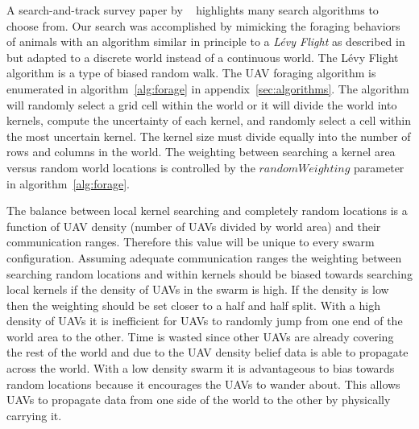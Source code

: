A search-and-track survey paper by ~\textcite{senanayake} highlights many search algorithms to choose from. Our search was accomplished by mimicking the foraging behaviors of animals with an algorithm similar in principle to a \textit{L\'evy Flight} as described in \textcite{humphries} but adapted to a discrete world instead of a continuous world.  The L\'evy Flight algorithm is a type of biased random walk.  The UAV foraging algorithm is enumerated in algorithm~\ref{alg:forage} in appendix~\ref{sec:algorithms}.  The algorithm will randomly select a grid cell within the world or it will divide the world into kernels, compute the uncertainty of each kernel, and randomly select a cell within the most uncertain kernel.  The kernel size must divide equally into the number of rows and columns in the world.  The weighting between searching a kernel area versus random world locations is controlled by the $randomWeighting$ parameter in algorithm~\ref{alg:forage}.


The balance between local kernel searching and completely random locations is a function of UAV density (number of UAVs divided by world area) and their communication ranges.  Therefore this value will be unique to every swarm configuration.  Assuming adequate communication ranges the weighting between searching random locations and within kernels should be biased towards searching local kernels if the density of UAVs  in the swarm is high.  If the density is low then the weighting should be set closer to a half and half split.  With a high density of UAVs it is inefficient for UAVs to randomly jump from one end of the world area to the other.  Time is wasted since other UAVs are already covering the rest of the world and due to the UAV density belief data is able to propagate across the world.  With a low density swarm it is advantageous to bias towards random locations because it encourages the UAVs to wander about.  This allows UAVs to propagate data from one side of the world to the other by physically carrying it.  


